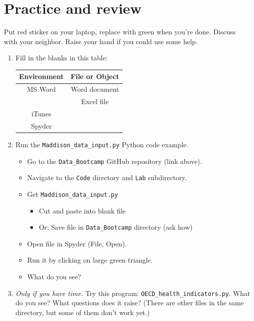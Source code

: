 \section*{Practice and review}


Put red sticker on your laptop, replace with green when you're done.
Discuss with your neighbor.
Raise your hand if you could use some help.

\begin{enumerate}

\item Fill in the blanks in this table:

\begin{center}
\begin{tabular}{cc}
\toprule
Environment & File or Object \\
\midrule
MS Word  & Word document  \\
 & Excel file     \\
iTunes & \\
Spyder   &                \\
\bottomrule
\end{tabular}
\end{center}


\item Run the \verb|Maddison_data_input.py| Python code example.
\begin{itemize}
\item Go to the \verb|Data_Bootcamp| GitHub repository (link above).
\item Navigate to the {\tt Code} directory and {\tt Lab} subdirectory.
\item Get \verb|Maddison_data_input.py|
\begin{itemize}
\item Cut and paste into blank file
\item Or:  Save file in \verb|Data_Bootcamp| directory (ask how)
\end{itemize}
\item Open file in Spyder (File, Open).
\item Run it by clicking on large green triangle.
\item What do you see?
\end{itemize}

\item {\it Only if you have time.\/} Try this program: \verb|OECD_health_indicators.py|.
What do you see?  What questions does it raise?
(There are other files in the same directory, but some of them don't work yet.)
\end{enumerate}


